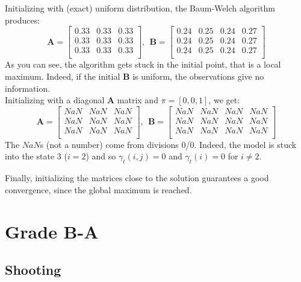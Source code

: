 \documentclass{scrartcl}
\begin{document}
Initializing with (exact) uniform distribution, the Baum-Welch algorithm produces:
\begin{equation}
  \mathbf{A} = 
 \begin{bmatrix}
  0.33 & 0.33 & 0.33 \\
  0.33 & 0.33 & 0.33 \\
  0.33 & 0.33 & 0.33 \\
 \end{bmatrix} 
 ,\ \ \mathbf{B} = 
 \begin{bmatrix}
  0.24 & 0.25 & 0.24 & 0.27 \\
  0.24 & 0.25 & 0.24 & 0.27 \\
  0.24 & 0.25 & 0.24 & 0.27 \\
 \end{bmatrix}
\end{equation}
As you can see, the algorithm gets stuck in the initial point, that is a local maximum. Indeed, if the initial $\mathbf{B}$ is uniform, the observations give no information. \\

Initializing with a diagonal $\mathbf{A}$ matrix and $\pi = \left[0,0,1\right]$, we get:
\begin{equation}
  \mathbf{A} = 
 \begin{bmatrix}
  NaN & NaN & NaN \\
  NaN & NaN & NaN \\
  NaN & NaN & NaN \\
 \end{bmatrix} 
 ,\ \ \mathbf{B} = 
 \begin{bmatrix}
  NaN & NaN & NaN & NaN \\
  NaN & NaN & NaN & NaN \\
  NaN & NaN & NaN & NaN \\
 \end{bmatrix}
\end{equation}
The $NaN$s (not a number) come from divisions 0/0. Indeed, the model is stuck into the state 3 ($i=2$) and so $\gamma_t(i,j)=0$ and $\gamma_t(i)=0$ for $i\neq2$.

Finally, initializing the matrices close to the solution guarantees a good convergence, since the global maximum is reached.


\section{Grade B-A}

\subsection{Shooting}
\end{document}
